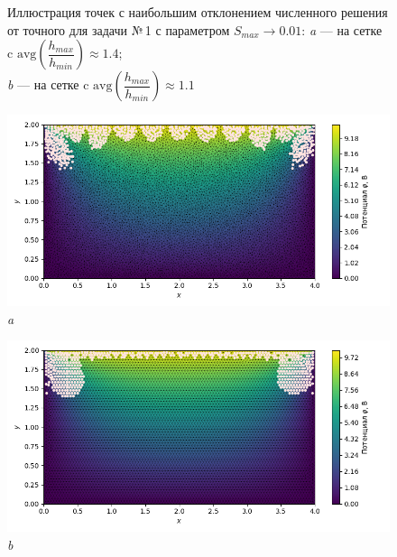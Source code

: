 \documentclass[12pt, a4paper]{article}
\begin{document}
\begin{figure}[!h]
\begin{center}
				\end{center} 
				\vspace*{-0.0mm} 
				\caption{Иллюстрация точек с наибольшим отклонением численного решения от точного для задачи №\,1 с параметром $S_{max} \rightarrow 0.01$: 
				\textit{a} --- на сетке c $\mathrm{avg} \left( \dfrac{h_{max}}{h_{min}} \right) \approx 1.4 $;\\
				\textit{b} --- на сетке c $\mathrm{avg} \left( \dfrac{h_{max}}{h_{min}} \right) \approx 1.1$
				} 
				\label{fig: max_err_001}
			\end{figure}
			
			
			\begin{figure}[!h]  
				\centering     
				\vspace{5.0mm} 
				\begin{center} 
					{ 
						\begin{minipage}{0.45\textwidth} 
							\centering 
							\hspace*{-32.7mm}
							\includegraphics[width=1.4\columnwidth]{rect_dirichlet_only_0001_err_nodes.png}\\ 
							\hspace*{-42.7mm}
							\textit{a} 
						\end{minipage}                                 
					} 
					{ 
						\begin{minipage}{0.45\textwidth} 
							\centering 
							\hspace*{-8.2mm}
							\includegraphics[width=1.4\columnwidth]{rect_dirichlet_only_0001_calfem_err_nodes.png}\\ 
							\hspace*{2.2mm}
							\textit{b} 
						\end{minipage}                                 
					} 
					

\end{center}
\end{figure}
\end{document}

